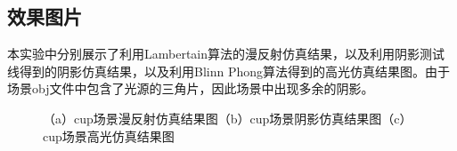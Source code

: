 \documentclass[10pt]{article}
\begin{document}
\subsection{效果图片}
本实验中分别展示了利用Lambertain算法的漫反射仿真结果，以及利用阴影测试线得到的阴影仿真结果，以及利用Blinn Phong算法得到的高光仿真结果图。由于场景obj文件中包含了光源的三角片，因此场景中出现多余的阴影。
\begin{figure}[H]
\centering
{}
\quad
{}
\quad
{}
\caption{（a）cup场景漫反射仿真结果图（b）cup场景阴影仿真结果图（c）cup场景高光仿真结果图}
\end{figure}
\end{document}
